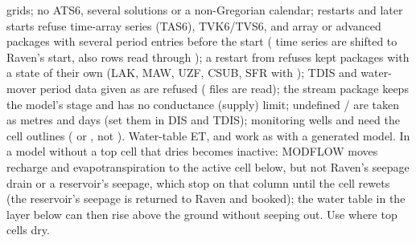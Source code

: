 \begin{itemize}
grids; no ATS6, several solutions or a non-Gregorian calendar; restarts and later starts refuse time-array series (TAS6),
TVK6/TVS6, and array or advanced packages with several period entries before the start ( time series are shifted
to Raven's start, also rows read through ); a restart from  refuses kept packages with a state
of their own (LAK, MAW, UZF, CSUB, SFR with ); TDIS and water-mover period data given as  are refused ( files are read); the stream
package keeps the model's stage and has no conductance (supply) limit; undefined / are
taken as metres and days (set them in DIS and TDIS); monitoring wells and  need the cell outlines
( or , not ). Water-table ET,  and
 work as with a generated model. In a model without  a top cell that dries becomes
inactive: MODFLOW moves recharge and evapotranspiration to the active cell below, but not Raven's seepage drain or a
reservoir's seepage, which stop on that column until the cell rewets (the reservoir's seepage is returned to Raven and
booked); the water table in the layer below can then rise above the ground without seeping out. Use  where top
cells dry.
\end{itemize}
